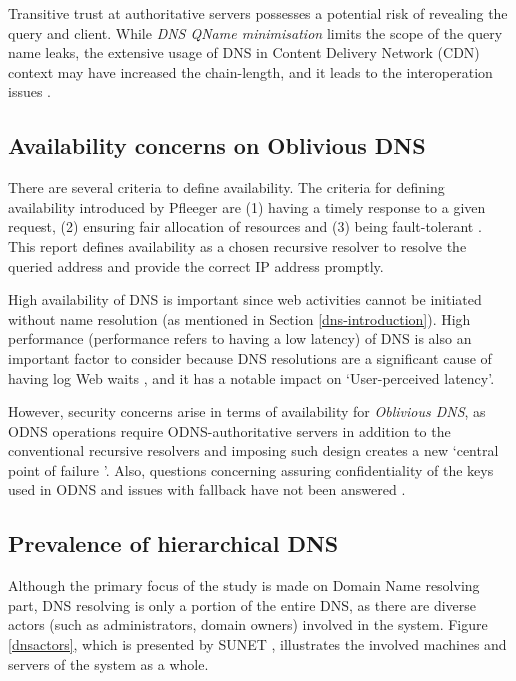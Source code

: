 Transitive trust at authoritative servers possesses a potential risk of revealing the query and client. While \textit{DNS QName minimisation} \cite{bortzmeyer2016dns} limits the scope of the query name leaks, the extensive usage of DNS in Content Delivery Network (CDN) context \cite{WANG2018235} may have increased the chain-length, and it leads to the interoperation issues \cite{Huque-QNAME-Min-analysis}.

\subsection{Availability concerns on Oblivious DNS}
There are several criteria to define availability. The criteria for defining availability introduced by Pfleeger are (1) having a timely response to a given request, (2) ensuring fair allocation of resources and (3) being fault-tolerant \cite{securityincomputing}.
This report defines availability as a chosen recursive resolver to resolve the queried address and provide the correct IP address promptly.

High availability of DNS is important since web activities cannot be initiated without name resolution (as mentioned in Section \ref{dns-introduction}). High performance (performance refers to having a low latency) of DNS is also an important factor to consider because DNS resolutions are a significant cause of having log Web waits \cite{cohen2003proactive, jung2002dns}, and it has a notable impact on `User-perceived latency'.

However, security concerns arise in terms of availability for \textit{Oblivious DNS}, as ODNS operations require ODNS-authoritative servers in addition to the conventional recursive resolvers and imposing such design creates a new `central point of failure \cite{minutes-102-dprive}'.
Also, questions concerning assuring confidentiality of the keys used in ODNS and issues with fallback have not been answered \cite{minutes-102-dprive}.

\subsection{Prevalence of hierarchical DNS}
Although the primary focus of the study is made on Domain Name resolving part, DNS resolving is only a portion of the entire DNS, as there are diverse actors (such as administrators, domain owners) involved in the system.
Figure \ref{dnsactors}, which is presented by SUNET \cite{SUNET-DNS}, illustrates the involved machines and servers of the system as a whole.

